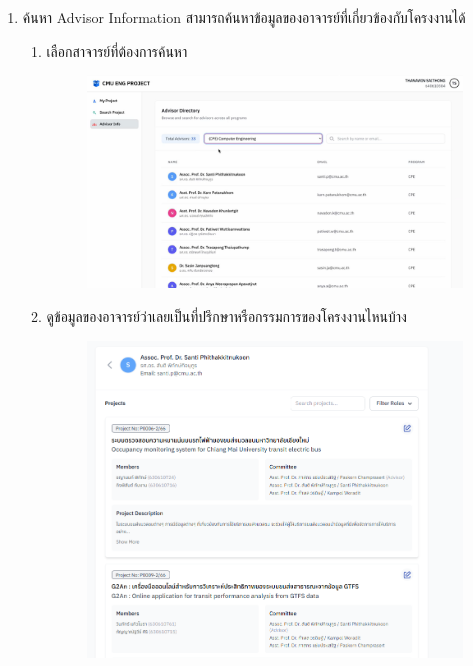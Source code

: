 \begin{itemize}
\begin{enumerate}
\begin{enumerate}
\begin{figure}[H]
        \end{figure} 
    \end{enumerate}
    \item ค้นหา Advisor Information สามารถค้นหาข้อมูลของอาจารย์ที่เกี่ยวข้องกับโครงงานได้
    \begin{enumerate}
        \item เลือกสาจารย์ที่ต้องการค้นหา
        \begin{figure}[H]
            \centering
            \includegraphics[width=130mm, keepaspectratio ]{pictures/project_box/advisor_info.png}
        \end{figure} 
        \item ดูข้อมูลของอาจารย์ว่าเลยเป็นที่ปรึกษาหรือกรรมการของโครงงานไหนบ้าง
        \begin{figure}[H]
            \centering
            \includegraphics[width=130mm, keepaspectratio ]{pictures/project_box/advisor_project_involvement.png}

\end{figure}
\end{enumerate}
\end{enumerate}
\end{itemize}
